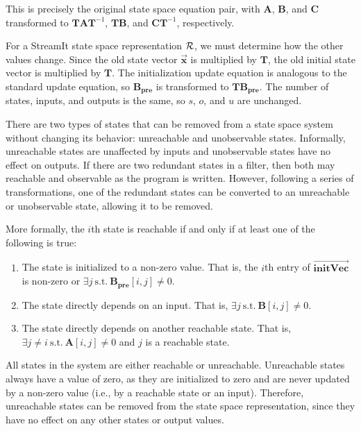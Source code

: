 This is precisely the original state space equation pair,
with $\mathbf{A}$, $\mathbf{B}$, and $\mathbf{C}$ transformed to
$\mathbf{T} \mathbf{A} \mathbf{T}^{-1}$, $\mathbf{T} \mathbf{B}$,
and $\mathbf{C} \mathbf{T}^{-1}$, respectively.

For a StreamIt state space representation $\cal{R}$, we must determine
how the other values change.  Since the old state vector
$\vec{\mathbf{x}}$ is multiplied by $\mathbf{T}$, the old initial
state vector is multiplied by $\mathbf{T}$.  The initialization update
equation is analogous to the standard update equation, so
$\mathbf{B_{pre}}$ is transformed to $\mathbf{T} \mathbf{B_{pre}}$.  The
number of states, inputs, and outputs is the same, so $s$, $o$, and
$u$ are unchanged.

\label{sec:state-removal}

There are two types of states that can be removed from a state space
system without changing its behavior: unreachable and unobservable
states.  Informally, unreachable states are unaffected by inputs and
unobservable states have no effect on outputs.  If there are two
redundant states in a filter, then both may reachable and observable
as the program is written.  However, following a series of
transformations, one of the redundant states can be converted to an
unreachable or unobservable state, allowing it to be removed.

More formally, the $i$th state is reachable if and only if at least
one of the following is true:
\begin{enumerate}
\item \parbox[t]{2.8in}{The state is initialized to a non-zero value.
That is, the $i$th entry of $\overrightarrow{\mathbf{initVec}}$ is
non-zero or $\exists j~\mbox{s.t.}~\mathbf{B_{pre}}[i,j] \ne 0$.}

\item \parbox[t]{2.8in}{The state directly depends on an input.  That
is, $\exists j~\mbox{s.t.}~\mathbf{B}[i,j] \ne 0$.}

\item \parbox[t]{2.8in}{The state directly depends on another
reachable state.  That is, $\exists j \ne
i~\mbox{s.t.}~\mathbf{A}[i,j] \ne 0$ and $j$ is a reachable state.}
\end{enumerate}
All states in the system are either reachable or unreachable.
Unreachable states always have a value of zero, as they are
initialized to zero and are never updated by a non-zero value (i.e.,
by a reachable state or an input).  Therefore, unreachable states can
be removed from the state space representation, since they have no
effect on any other states or output values.

